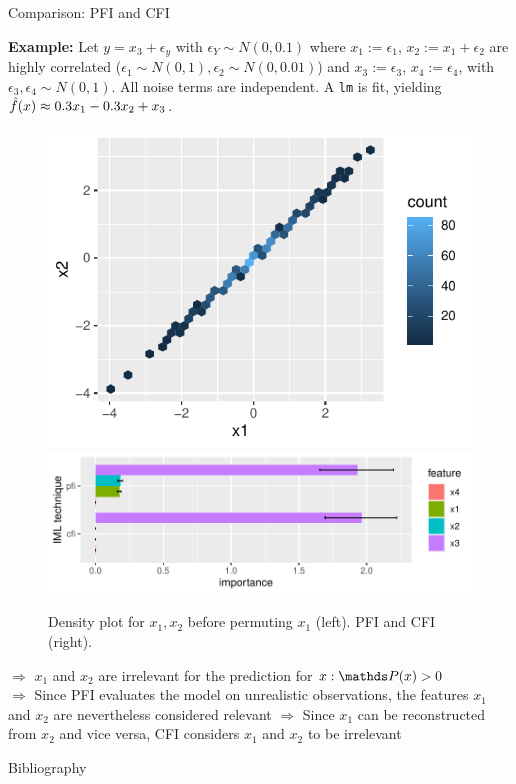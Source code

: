 \documentclass[11pt,compress,t,notes=noshow, aspectratio=169, xcolor=table]{beamer}
\begin{document}
\begin{vbframe}{Comparison: PFI and CFI}
 
 \textbf{Example:} Let $y = x_3 + \epsilon_y$ with $\epsilon_Y \sim N(0, 0.1)$ where $x_1 :=  \epsilon_1$, $x_2 := x_1 + \epsilon_2$ are highly correlated ($\epsilon_1 \sim N(0,1), \epsilon_2 \sim N(0, 0.01)$) and $x_3 := \epsilon_3$, $x_4 := \epsilon_4$,  with $\epsilon_3, \epsilon_4 \sim N(0,1)$. All noise terms are independent.
A \texttt{lm} is fit, yielding $\fh(x) \approx 0.3 x_1 - 0.3 x_2 + x_3$.\\
\begin{figure}
\hfill
  \includegraphics[width=0.25\linewidth]{figure_man/pfi_hexbin_pre.pdf}\hfill
  \includegraphics[width=0.6\linewidth]{figure_man/cfi_pfi.pdf} \hfill
  \caption{Density plot for $x_1, x_2$ before permuting $x_1$ (left). PFI and CFI (right).}
\end{figure}
% 
$\Rightarrow$ $x_1$ and $x_2$ are irrelevant for the prediction for $x: \P(x) > 0$ \\
$\Rightarrow$ Since PFI evaluates the model on unrealistic observations, the features $x_1$ and $x_2$ are nevertheless considered relevant
$\Rightarrow$ Since $x_1$ can be reconstructed from $x_2$ and vice versa, CFI considers $x_1$ and $x_2$ to be irrelevant

 \end{vbframe}

\begin{vbframe}{Bibliography}
  \printbibliography
\end{vbframe}

\endlecture
\end{document}
